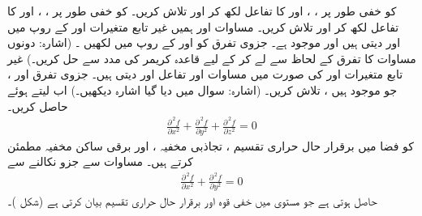  کو خفی طور پر ، ،  اور  کا تفاعل لکھ کر  اور  تلاش کریں۔
 کو خفی طور پر ،  ، اور  کا تفاعل لکھ کر  اور  تلاش کریں۔
  مساوات  اور  ہمیں    غیر تابع متغیرات  اور  کے روپ میں  اور    دیتی ہیں اور     موجود ہے۔  جزوی تفرق     کو   اور   کے روپ میں لکھیں ۔ (اشارہ:  دونوں مساوات کا تفرق  کے لحاظ سے لے کر   کے لیے  قاعدہ کریمر کی مدد سے حل کریں۔)
غیر تابع متغیرات  اور  کی صورت میں مساوات  اور   تفاعل      اور    دیتی   ہیں۔ جزوی تفرق  اور  ،   جو موجود  ہیں ،  تلاش کریں۔ (اشارہ: سوال   میں دیا گیا اشارہ دیکھیں۔)   اب  لیتے ہوئے  حاصل کریں۔
\\
\begin{align}\label{مساوات_کثیر_المتغیر_مساوات_لاپلاس_الف}
\frac{\partial^{\,2}f}{\partial x^2}+\frac{\partial^{\,2}f}{\partial y^2}+\frac{\partial^{\,2}f}{\partial z^2}=0
\end{align}
کو فضا میں  برقرار حال حراری تقسیم ، تجاذبی  مخفیہ ، اور برقی ساکن مخفیہ   مطمئن کرتے ہیں۔ مساوات  سے جزو  نکالنے سے    
 \begin{align}\label{مساوات_کثیر_المتغیر_مساوات_لاپلاس_ب}
\frac{\partial^{\,2}f}{\partial x^2}+\frac{\partial^{\,2}f}{\partial y^2}=0
\end{align}
حاصل ہوتی ہے جو مستوی میں  خفی قوہ اور برقرار حال حراری تقسیم  بیان کرتی ہے (شکل )۔

